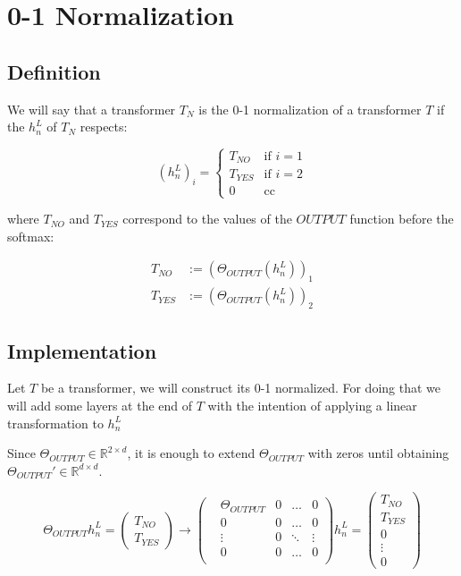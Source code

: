 \section*{0-1 Normalization}

\subsection*{Definition}

We will say that a transformer $T_N$ is the 0-1 normalization of a transformer $T$ if the $h_n^L$ of $T_N$ respects:


\begin{equation*}
(h_n^L)_i =
\begin{cases}
T_{NO} & \text{if } i = 1 \\
T_{YES} & \text{if } i = 2 \\
0 & \text{cc }
\end{cases}
\end{equation*}

where $T_{NO}$ and $T_{YES}$ correspond to the values of the $OUTPUT$ function before the softmax:

\begin{align*}
    T_{NO} &:= (\Theta_{OUTPUT}(h_n^L))_1 \\
    T_{YES} &:= (\Theta_{OUTPUT}(h_n^L))_2 
\end{align*}


\subsection*{Implementation}

Let $T$ be a transformer, we will construct its 0-1 normalized. For doing that we will add some layers at the end of $T$ with the intention of applying a linear transformation to $h_n^L$

Since $\Theta_{OUTPUT} \in \mathbb{R}^{2\times d}$, it is enough to extend $\Theta_{OUTPUT}$ with zeros until obtaining $\Theta_{OUTPUT}' \in \mathbb{R}^{d\times d}$.


\begin{equation*}
    \Theta_{OUTPUT}h_n^L =   
    \left(\begin{matrix}
        T_{NO} \\
        T_{YES}
    \end{matrix}\right) \longrightarrow
    \left(\begin{matrix}
        &\Theta_{OUTPUT} &0 &\dots  &0 \\
        &0                &0 &\dots  &0 \\
        &\vdots           &0 &\ddots &\vdots \\
        &0                &0 &\dots  &0 \\
    \end{matrix}\right)h_n^L = 
    \left(\begin{matrix}
        T_{NO} \\
        T_{YES} \\ 
        0 \\
        \vdots \\
        0
    \end{matrix}\right)
\end{equation*}


